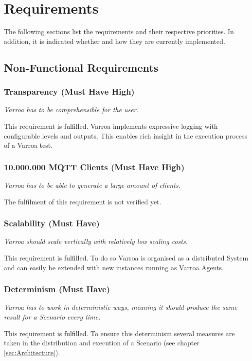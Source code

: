 \chapter{Requirements}
The following sections list the requirements and their respective priorities.
In addition, it is indicated whether and how they are currently implemented.

\section{Non-Functional Requirements}

\subsection{Transparency (Must Have High)}\label{sec:Transparency}
\emph{Varroa has to be comprehensible for the user.}

This requirement is fulfilled.
Varroa implements expressive logging with configurable levels and outputs.
This enables rich insight in the execution process of a Varroa test.

\subsection{10.000.000 MQTT Clients (Must Have High)} 
\emph{Varroa has to be able to generate a large amount of clients.}

The fulfilment of this requirement is not verified yet.

\subsection{Scalability (Must Have)} 
\emph{Varroa should scale vertically with relatively low scaling costs.}

This requirement is fulfilled.
To do so Varroa is organised as a distributed System and can easily be extended with new instances running as Varroa Agents.

\subsection{Determinism (Must Have)} 
\emph{Varroa has to work in deterministic ways, meaning it should produce the same result for a Scenario every time.}

This requirement is fulfilled.
To ensure this determinism several measures are taken in the distribution and execution of a Scenario (see chapter \ref{sec:Architecture}).

